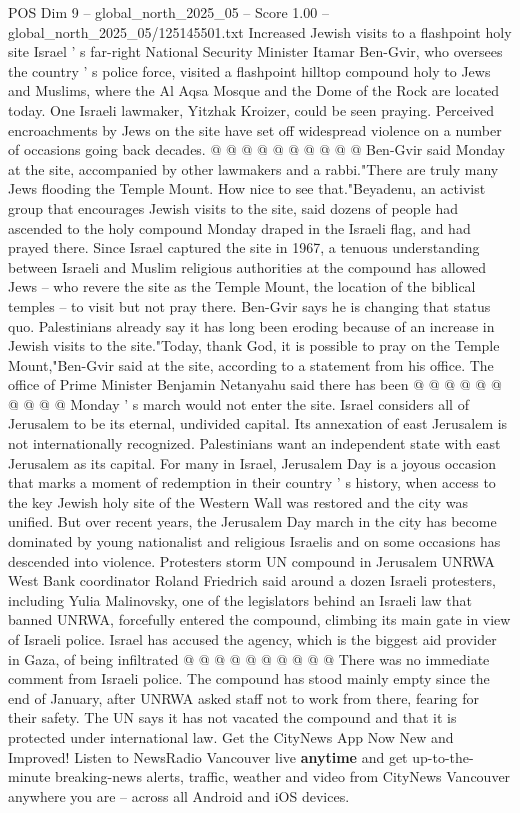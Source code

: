 \begin{textsample}{POS Dim 9 – global\_north\_2025\_05 – Score 1.00 – global\_north\_2025\_05/125145501.txt}
Increased Jewish visits to a flashpoint holy site Israel ' s far-right National Security Minister Itamar Ben-Gvir, who oversees the country ' s police force, visited a flashpoint hilltop compound holy to Jews and Muslims, where the Al Aqsa Mosque and the Dome of the Rock are located today.
One Israeli lawmaker, Yitzhak Kroizer, could be seen praying.
Perceived encroachments by Jews on the site have set off widespread violence on a number of occasions going back decades. @ @ @ @ @ @ @ @ @ @ Ben-Gvir said Monday at the site, accompanied by other lawmakers and a rabbi."There are truly many Jews flooding the Temple Mount.
How nice to see that."Beyadenu, an activist group that encourages Jewish visits to the site, said dozens of people had ascended to the holy compound Monday draped in the Israeli flag, and had prayed there.
Since Israel captured the site in 1967, a tenuous understanding between Israeli and Muslim religious authorities at the compound has allowed Jews -- who revere the site as the Temple Mount, the location of the biblical temples -- to visit but not pray there.
Ben-Gvir says he is changing that status quo.
Palestinians already say it has long been eroding because of an increase in Jewish visits to the site."Today, thank God, it is possible to pray on the Temple Mount,"Ben-Gvir said at the site, according to a statement from his office.
The office of Prime Minister Benjamin Netanyahu said there has been @ @ @ @ @ @ @ @ @ @ Monday ' s march would not enter the site.
Israel considers all of Jerusalem to be its eternal, undivided capital.
Its annexation of east Jerusalem is not internationally recognized.
Palestinians want an independent state with east Jerusalem as its capital.
For many in Israel, Jerusalem Day is a joyous occasion that marks a moment of redemption in their country ' s history, when access to the key Jewish holy site of the Western Wall was restored and the city was unified.
But over recent years, the Jerusalem Day march in the city has become dominated by young nationalist and religious Israelis and on some occasions has descended into violence.
Protesters storm UN compound in Jerusalem UNRWA West Bank coordinator Roland Friedrich said around a dozen Israeli protesters, including Yulia Malinovsky, one of the legislators behind an Israeli law that banned UNRWA, forcefully entered the compound, climbing its main gate in view of Israeli police.
Israel has accused the agency, which is the biggest aid provider in Gaza, of being infiltrated @ @ @ @ @ @ @ @ @ @ There was no immediate comment from Israeli police.
The compound has stood mainly empty since the end of January, after UNRWA asked staff not to work from there, fearing for their safety.
The UN says it has not vacated the compound and that it is protected under international law.
Get the CityNews App Now New and Improved!
Listen to NewsRadio Vancouver live \textbf{anytime} and get up-to-the-minute breaking-news alerts, traffic, weather and video from CityNews Vancouver anywhere you are -- across all Android and iOS devices.

\end{textsample}

